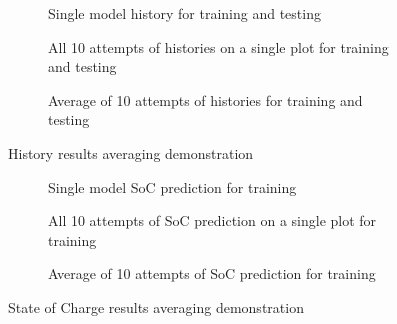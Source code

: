 \begin{figure*}[htbp]
  \centering
  \begin{subfigure}[b]{0.325\textwidth}
      \centering
      
      \caption{Single model history for training and testing}
      \label{subfig:Model-DEMO-1}
  \end{subfigure}
  \hfill
  \begin{subfigure}[b]{0.325\textwidth}
      \centering
      
      \caption{All 10 attempts of histories on a single plot for training and testing}
      \label{subfig:Model-DEMO-10}
  \end{subfigure}
  \hfill
  \begin{subfigure}[b]{0.325\textwidth}
      \centering
      
      \caption{Average of 10 attempts of histories for training and testing}
      \label{subfig:Model-DEMO-avr}
  \end{subfigure}
  \caption{History results averaging demonstration}
  \label{fig:Model-DEMO}
\end{figure*}
\begin{figure*}[htbp]
  \centering
  \begin{subfigure}[b]{0.325\textwidth}
      \centering
      
      \caption{Single model SoC prediction for training \ \ \ \ \ }
      \label{subfig:Model-DEMO2-1}
  \end{subfigure}
  \hfill
  \begin{subfigure}[b]{0.325\textwidth}
      \centering
      
      \caption{All 10 attempts of SoC prediction on a single plot for training}
      \label{subfig:Model-DEMO2-10}
  \end{subfigure}
  \hfill
  \begin{subfigure}[b]{0.325\textwidth}
      \centering
      
      \caption{Average of 10 attempts of SoC prediction for training}
      \label{subfig:Model-DEMO2-avr}
  \end{subfigure}
  \caption{State of Charge results averaging demonstration}
  \label{fig:Model-DEMO2}
\end{figure*}

